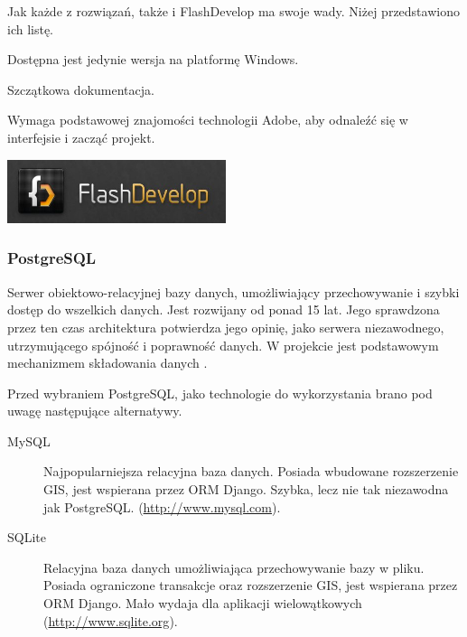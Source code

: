 Jak każde z rozwiązań, także i FlashDevelop ma swoje wady. Niżej przedstawiono ich listę.
\begin{packed_item}
    \item{Dostępna jest jedynie wersja na platformę Windows.}
    \item{Szczątkowa dokumentacja.}
    \item{Wymaga podstawowej znajomości technologii Adobe, aby odnaleźć się w interfejsie i zacząć projekt.}
\end{packed_item}

\begin{center}
    \includegraphics[width=0.48\textwidth]{img/logos/flashdevelop.jpg}
\end{center}

\newpage
\subsubsection{PostgreSQL}
Serwer obiektowo-relacyjnej bazy danych, umożliwiający przechowywanie i szybki dostęp do wszelkich danych. Jest rozwijany od ponad 15 lat. Jego sprawdzona przez ten czas architektura potwierdza jego opinię, jako serwera niezawodnego, utrzymującego spójność i poprawność danych. W projekcie jest podstawowym mechanizmem składowania danych \cite{PostgreSQL}.

Przed wybraniem PostgreSQL, jako technologie do wykorzystania brano pod uwagę następujące alternatywy.
\begin{description}
    \item[MySQL] Najpopularniejsza relacyjna baza danych. Posiada wbudowane rozszerzenie GIS, jest wspierana przez ORM Django. Szybka, lecz nie tak niezawodna jak PostgreSQL.  (\url{http://www.mysql.com}).
    \item[SQLite] Relacyjna baza danych umożliwiająca przechowywanie bazy w pliku. Posiada ograniczone transakcje oraz rozszerzenie GIS, jest wspierana przez ORM Django. Mało wydaja dla aplikacji wielowątkowych (\url{http://www.sqlite.org}).
\end{description}

